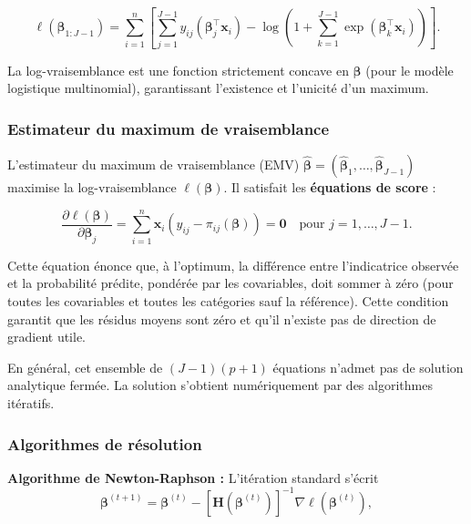 \documentclass[12pt,a4paper]{article}
\begin{document}
\begin{equation}\label{eq:loglikelihood-constrained}
\ell(\boldsymbol{\beta}_{1:J-1}) = \sum_{i=1}^{n} \left[ \sum_{j=1}^{J-1} y_{ij} (\boldsymbol{\beta}_j^\top \mathbf{x}_i) - \log\left(1 + \sum_{k=1}^{J-1} \exp(\boldsymbol{\beta}_k^\top \mathbf{x}_i)\right) \right].
\end{equation}

La log-vraisemblance est une fonction strictement concave en $\boldsymbol{\beta}$ (pour le modèle logistique multinomial), garantissant l'existence et l'unicité d'un maximum.

\subsubsection{Estimateur du maximum de vraisemblance}

L'estimateur du maximum de vraisemblance (EMV) $\widehat{\boldsymbol{\beta}} = (\widehat{\boldsymbol{\beta}}_1, \ldots, \widehat{\boldsymbol{\beta}}_{J-1})$ maximise la log-vraisemblance $\ell(\boldsymbol{\beta})$. Il satisfait les \textbf{équations de score} :

\begin{equation}\label{eq:score}
\frac{\partial \ell(\boldsymbol{\beta})}{\partial \boldsymbol{\beta}_j} = \sum_{i=1}^{n} \mathbf{x}_i (y_{ij} - \pi_{ij}(\boldsymbol{\beta})) = \mathbf{0} \quad \text{pour } j = 1, \ldots, J-1.
\end{equation}

Cette équation énonce que, à l'optimum, la différence entre l'indicatrice observée et la probabilité prédite, pondérée par les covariables, doit sommer à zéro (pour toutes les covariables et toutes les catégories sauf la référence). Cette condition garantit que les résidus moyens sont zéro et qu'il n'existe pas de direction de gradient utile.

En général, cet ensemble de $(J-1)(p+1)$ équations n'admet pas de solution analytique fermée. La solution s'obtient numériquement par des algorithmes itératifs.

\subsubsection{Algorithmes de résolution}

\textbf{Algorithme de Newton-Raphson :} L'itération standard s'écrit
\begin{equation}
\boldsymbol{\beta}^{(t+1)} = \boldsymbol{\beta}^{(t)} - \left[ \mathbf{H}(\boldsymbol{\beta}^{(t)}) \right]^{-1} \nabla \ell(\boldsymbol{\beta}^{(t)}),
\end{equation}
\end{document}
